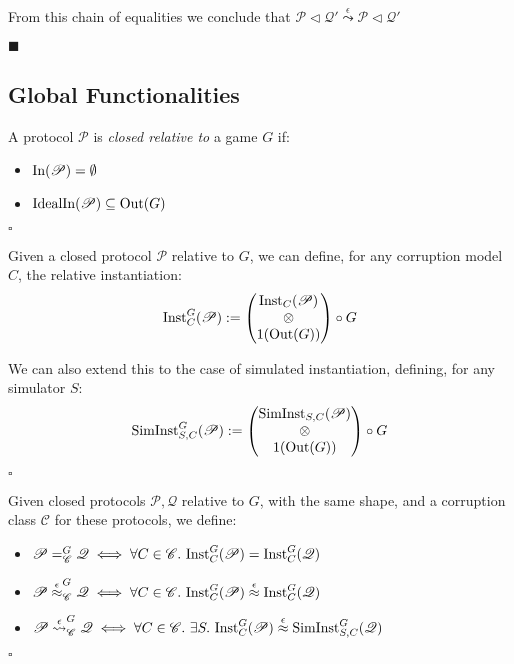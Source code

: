 \begin{theorem}
  From this chain of equalities we conclude that
  $\mathscr{P} \lhd \mathscr{Q}' \overset{\epsilon}{\leadsto} \mathscr{P} \lhd \mathscr{Q}'$

  $\blacksquare$
\end{theorem}

\subsection{Global Functionalities}

\begin{definition}
  A protocol $\mathscr{P}$ is \emph{closed relative to} a game $G$
  if:
  \begin{itemize}
    \item $\text{In}(\mathscr{P}) = \emptyset$
    \item $\text{IdealIn}(\mathscr{P}) \subseteq \text{Out}(G)$
  \end{itemize} 

  $\square$
\end{definition}
\begin{definition}
  Given a closed protocol $\mathscr{P}$ relative to $G$, we can define,
  for any corruption model $C$,
  the relative instantiation:
  $$
  \text{Inst}_{C}^G(\mathscr{P}) :=
  \begin{pmatrix}
    \text{Inst}_C(\mathscr{P})\cr
    \otimes\cr
    1(\text{Out}(G))
  \end{pmatrix}
  \circ G
  $$

  We can also extend this to the case of simulated instantiation,
  defining, for any simulator $S$:
  $$
  \text{SimInst}_{S, C}^G(\mathscr{P}) :=
  \begin{pmatrix}
    \text{SimInst}_{S, C}(\mathscr{P})\cr
    \otimes\cr
    1(\text{Out}(G))
  \end{pmatrix}
  \circ G
  $$

  $\square$
\end{definition}

\begin{definition}
  Given closed protocols $\mathscr{P}, \mathscr{Q}$ relative to $G$,
  with the same shape, and a corruption class $\mathscr{C}$
  for these protocols, we define:
  \begin{itemize}
    \item $\mathscr{P} =^G_{\mathscr{C}} \mathscr{Q} \iff \forall C \in \mathscr{C}.\ \text{Inst}^G_C(\mathscr{P}) = \text{Inst}^G_C(\mathscr{Q})$
    \item $\mathscr{P} \overset{\epsilon}{\approx}^G_{\mathscr{C}} \mathscr{Q}\iff \forall C \in \mathscr{C}.\ \text{Inst}^G_C(\mathscr{P}) \overset{\epsilon}{\approx} \text{Inst}^G_C(\mathscr{Q})$
    \item $\mathscr{P} \overset{\epsilon}{\leadsto}^G_{\mathscr{C}} \mathscr{Q}\iff \forall C \in \mathscr{C}.\ \exists S.\ \text{Inst}^G_C(\mathscr{P}) \overset{\epsilon}{\approx} \text{SimInst}^G_{S,C}(\mathscr{Q})$
  \end{itemize}

  $\square$
\end{definition}


